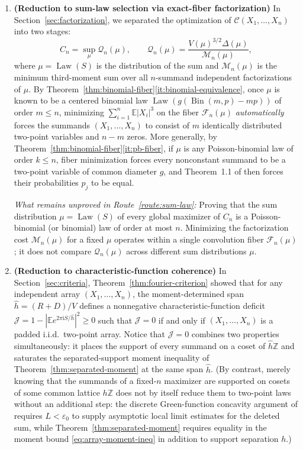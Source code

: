 \documentclass[11pt]{article}
\numberwithin{equation}{section}
\theoremstyle{definition}
\theoremstyle{remark}
\DeclareMathOperator{\Bin}{Bin}
\DeclareMathOperator{\Law}{Law}
\newcommand{\E}{\mathbb E}
\newcommand{\Z}{\mathbb Z}
\newcommand{\eps}{\varepsilon}
\newcommand{\ii}{\mathrm i}
\begin{document}
\begin{enumerate}[label=\textbf{Route \arabic*.},ref=\arabic*,leftmargin=5.5em]
\item\label{route:sum-law} \textbf{(Reduction to sum-law selection via exact-fiber factorization)}
In Section~\ref{sec:factorization}, we separated the optimization of
$\mathcal C(X_1,\ldots,X_n)$ into two stages:
\[
 C_n=\sup_{\mu}\mathcal Q_n(\mu),\qquad
 \mathcal Q_n(\mu)=\frac{V(\mu)^{3/2}\Delta(\mu)}{\mathcal M_n(\mu)},
\]
where $\mu=\Law(S)$ is the distribution of the sum and $\mathcal M_n(\mu)$ is
the minimum third-moment sum over all $n$-summand independent factorizations
of $\mu$. By Theorem~\ref{thm:binomial-fiber}\ref{it:binomial-equivalence},
once $\mu$ is known to be a centered binomial law $\Law(g(\Bin(m,p)-mp))$ of
order $m\le n$, minimizing $\sum_{i=1}^n\E|X_i|^3$ on the fiber
$\mathcal F_n(\mu)$ \emph{automatically} forces the summands $(X_1,\ldots,X_n)$
to consist of $m$ identically distributed two-point variables and $n-m$ zeros.
More generally, by Theorem~\ref{thm:binomial-fiber}\ref{it:pb-fiber}, if
$\mu$ is any Poisson-binomial law of order $k\le n$, fiber minimization forces
every nonconstant summand to be a two-point variable of common diameter $g$,
and Theorem~1.1 of \citet{BellBernoulli2026} then forces their probabilities
$p_j$ to be equal.

\emph{What remains unproved in Route~\ref{route:sum-law}:} Proving that the
sum distribution $\mu=\Law(S)$ of every global maximizer of $C_n$ is a
Poisson-binomial (or binomial) law of order at most $n$. Minimizing the
factorization cost $\mathcal M_n(\mu)$ for a fixed $\mu$ operates within a
single convolution fiber $\mathcal F_n(\mu)$; it does not compare
$\mathcal Q_n(\mu)$ across different sum distributions $\mu$.

\item\label{route:coherence} \textbf{(Reduction to characteristic-function coherence)}
In Section~\ref{sec:criteria}, Theorem~\ref{thm:fourier-criterion} showed that
for any independent array $(X_1,\ldots,X_n)$, the moment-determined span
$\widehat h=(R+D)/V$ defines a nonnegative characteristic-function deficit
$\mathcal J=1-|\E e^{2\pi\ii S/\widehat h}|^2\ge0$ such that $\mathcal J=0$ if
and only if $(X_1,\ldots,X_n)$ is a padded i.i.d.\ two-point array. Notice
that $\mathcal J=0$ combines two properties simultaneously: it places the
support of every summand on a coset of $\widehat h\Z$ and saturates the
separated-support moment inequality of Theorem~\ref{thm:separated-moment} at
the same span $\widehat h$. (By contrast, merely knowing that the summands of
a fixed-$n$ maximizer are supported on cosets of some common lattice $h\Z$
does not by itself reduce them to two-point laws without an additional step:
the discrete Green-function concavity argument of
\citealp[Section~9]{BellSmallStructure2026} requires $L<\eps_0$ to supply
asymptotic local limit estimates for the deleted sum, while
Theorem~\ref{thm:separated-moment} requires equality in the moment bound
\eqref{eq:array-moment-ineq} in addition to support separation $h$.)


\end{enumerate}
\end{document}
